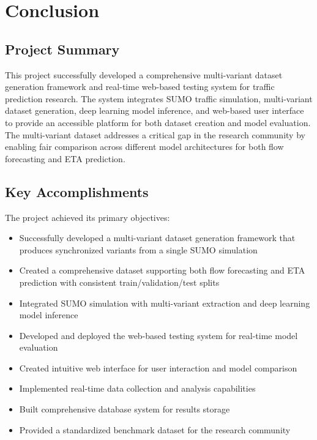 \section{Conclusion}

\subsection{Project Summary}

This project successfully developed a comprehensive multi-variant dataset generation framework and real-time web-based testing system for traffic prediction research. The system integrates SUMO traffic simulation, multi-variant dataset generation, deep learning model inference, and web-based user interface to provide an accessible platform for both dataset creation and model evaluation. The multi-variant dataset addresses a critical gap in the research community by enabling fair comparison across different model architectures for both flow forecasting and ETA prediction.

\subsection{Key Accomplishments}

The project achieved its primary objectives:
\begin{itemize}
    \item Successfully developed a multi-variant dataset generation framework that produces synchronized variants from a single SUMO simulation
    \item Created a comprehensive dataset supporting both flow forecasting and ETA prediction with consistent train/validation/test splits
    \item Integrated SUMO simulation with multi-variant extraction and deep learning model inference
    \item Developed and deployed the web-based testing system for real-time model evaluation
    \item Created intuitive web interface for user interaction and model comparison
    \item Implemented real-time data collection and analysis capabilities
    \item Built comprehensive database system for results storage
    \item Provided a standardized benchmark dataset for the research community
\end{itemize}


